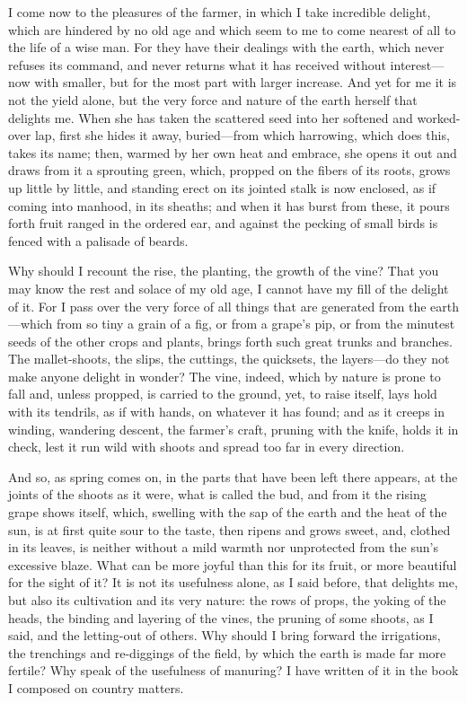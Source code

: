  I come now to the pleasures of the farmer, in which I take incredible delight, which are hindered by no old age and which seem to me to come nearest of all to the life of a wise man. For they have their dealings with the earth, which never refuses its command, and never returns what it has received without interest—now with smaller, but for the most part with larger increase. And yet for me it is not the yield alone, but the very force and nature of the earth herself that delights me. When she has taken the scattered seed into her softened and worked-over lap, first she hides it away, buried—from which harrowing, which does this, takes its name; then, warmed by her own heat and embrace, she opens it out and draws from it a sprouting green, which, propped on the fibers of its roots, grows up little by little, and standing erect on its jointed stalk is now enclosed, as if coming into manhood, in its sheaths; and when it has burst from these, it pours forth fruit ranged in the ordered ear, and against the pecking of small birds is fenced with a palisade of beards.

 Why should I recount the rise, the planting, the growth of the vine? That you may know the rest and solace of my old age, I cannot have my fill of the delight of it. For I pass over the very force of all things that are generated from the earth—which from so tiny a grain of a fig, or from a grape's pip, or from the minutest seeds of the other crops and plants, brings forth such great trunks and branches. The mallet-shoots, the slips, the cuttings, the quicksets, the layers—do they not make anyone delight in wonder? The vine, indeed, which by nature is prone to fall and, unless propped, is carried to the ground, yet, to raise itself, lays hold with its tendrils, as if with hands, on whatever it has found; and as it creeps in winding, wandering descent, the farmer's craft, pruning with the knife, holds it in check, lest it run wild with shoots and spread too far in every direction.

 And so, as spring comes on, in the parts that have been left there appears, at the joints of the shoots as it were, what is called the bud, and from it the rising grape shows itself, which, swelling with the sap of the earth and the heat of the sun, is at first quite sour to the taste, then ripens and grows sweet, and, clothed in its leaves, is neither without a mild warmth nor unprotected from the sun's excessive blaze. What can be more joyful than this for its fruit, or more beautiful for the sight of it? It is not its usefulness alone, as I said before, that delights me, but also its cultivation and its very nature: the rows of props, the yoking of the heads, the binding and layering of the vines, the pruning of some shoots, as I said, and the letting-out of others. Why should I bring forward the irrigations, the trenchings and re-diggings of the field, by which the earth is made far more fertile? Why speak of the usefulness of manuring? I have written of it in the book I composed on country matters.


